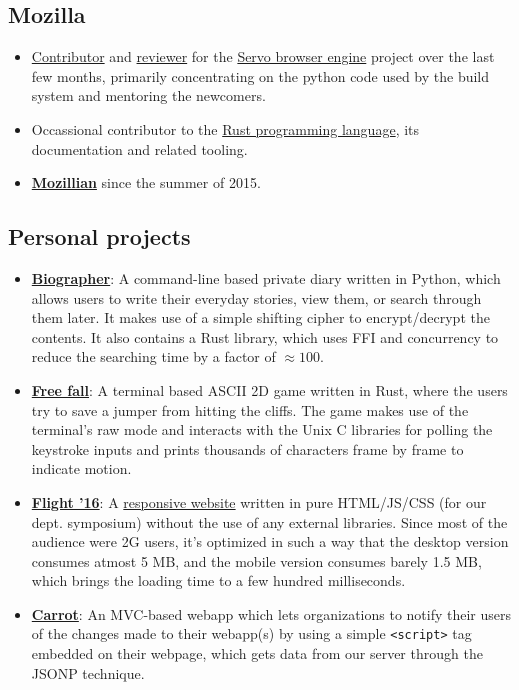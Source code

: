 \documentclass[11pt,a4paper,sans]{moderncv}        %
\newcommand\chref[3][linky]{\href{#2}{\color{#1}#3}}
\begin{document}
\subsection{Mozilla}
\begin{itemize}
\item \chref{https://github.com/servo/servo/commits?author=Wafflespeanut}{Contributor} and \chref{https://blog.servo.org/2016/01/11/twis-47/}{reviewer} for the \chref{https://github.com/servo/servo}{Servo browser engine} project over the last few months, primarily concentrating on the python code used by the build system and mentoring the newcomers.
\item Occassional contributor to the \chref{https://github.com/rust-lang/rust}{Rust programming language}, its documentation and related tooling.
\item \textbf{\chref{https://mozillians.org/en-US/u/wafflespeanut}{Mozillian}} since the summer of 2015.
\end{itemize}
\subsection{Personal projects}
\begin{itemize}
\item \textbf{\chref{https://github.com/Wafflespeanut/biographer}{Biographer}}: A command-line based private diary written in Python, which allows users to write their everyday stories, view them, or search through them later. It makes use of a simple shifting cipher to encrypt/decrypt the contents. It also contains a Rust library, which uses FFI and concurrency to reduce the searching time by a factor of $\approx 100$.
\item \textbf{\chref{https://github.com/Wafflespeanut/free-fall}{Free fall}}: A terminal based ASCII 2D game written in Rust, where the users try to save a jumper from hitting the cliffs. The game makes use of the terminal's raw mode and interacts with the Unix C libraries for polling the keystroke inputs and prints thousands of characters frame by frame to indicate motion.
\item \textbf{\chref{https://github.com/Wafflespeanut/flight-2016}{Flight '16}}: A \chref{http://wafflespeanut.github.io/flight-2016}{responsive website} written in pure HTML/JS/CSS (for our dept. symposium) without the use of any external libraries. Since most of the audience were 2G users, it's optimized in such a way that the desktop version consumes atmost 5 MB, and the mobile version consumes barely 1.5 MB, which brings the loading time to a few hundred milliseconds.
\item \textbf{\chref{https://github.com/joelewis/carrot}{Carrot}}: An MVC-based webapp which lets organizations to notify their users of the changes made to their webapp(s) by using a simple \texttt{<script>} tag embedded on their webpage, which gets data from our server through the JSONP technique.
\end{itemize}
\end{document}
